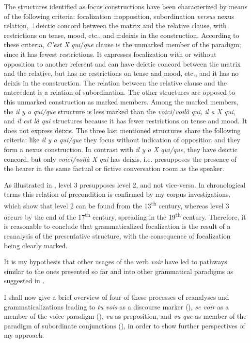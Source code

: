 \documentclass[output=paper]{langsci/langscibook}
\begin{document}
The structures identified as focus constructions have been characterized by means of the following criteria: focalization ±opposition, subordination \textit{versus} nexus relation, ±deictic concord between the matrix and the relative clause, with restrictions on tense, mood, etc., and ±deixis in the construction. According to these criteria, \textit{C’est X} \textit{qui}/\textit{que} clause is the unmarked member of the paradigm; since it has fewest restrictions. It expresses focalization with or without opposition to another referent and can have deictic concord between the matrix and the relative, but has no restrictions on tense and mood, etc., and it has no deixis in the construction. The relation between the relative clause and the antecedent is a relation of subordination. The other structures are opposed to this unmarked construction as marked members. Among the marked members, the \textit{il y a qui/que} structure is less marked than the \textit{voici}\slash\textit{voilà} \textit{qui, il a X qui}, and \textit{il est là qui} structures because it has fewer restrictions on tense and mood. It does not express deixis. The three last mentioned structures share the following criteria: like \textit{il y a qui/que} they focus without indication of opposition and they form a nexus construction. In contrast with \textit{il y a X qui/que}, they have deictic concord, but only \textit{voici/voilà X qui} has deixis, i.e. presupposes the presence of the hearer in the same factual or fictive conversation room as the speaker. 

As illustrated in , level 3 presupposes level 2, and not vice-versa. In chronological terms this relation of precondition is confirmed by my corpus investigations, which show that level 2 can be found from the 13\textsuperscript{th} century, whereas level 3 occurs by the end of the 17\textsuperscript{th} century, spreading in the 19\textsuperscript{th} century. Therefore, it is reasonable to conclude that grammaticalized focalization is the result of a reanalysis of the presentative structure, with the consequence of focalization being clearly marked. 

It is my hypothesis that other usages of the verb \textit{voir} have led to pathways similar to the ones presented so far and into other grammatical paradigms as suggested in . 

I shall now give a brief overview of four of these processes of reanalyses and grammaticalizations leading to \textit{tu vois} as a discourse marker (), \textit{se voir} as a member of the voice paradigm (), \textit{vu} as preposition, and \textit{vu que} as member of the paradigm of subordinate conjunctions (), in order to show further perspectives of my approach.
\end{document}
